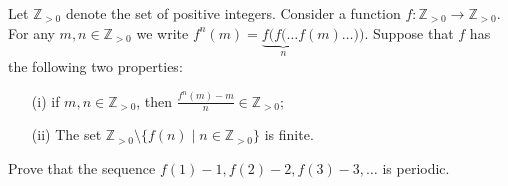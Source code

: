 Let 
$\mathbb{Z}_{>0}$
 denote the set of positive integers. Consider a function 
$f: \mathbb{Z}_{>0} \to \mathbb{Z}_{>0}$.
 For any 
$m, n \in \mathbb{Z}_{>0}$
 we write 
$f^n(m) = \underbrace{f(f(\ldots f}_{n}(m)\ldots))$.
 Suppose that 
$f$
 has the following two properties:

\begin{itemize}
	\item[(i)] if 
	$m, n \in \mathbb{Z}_{>0}$, 
	 then 
	$\frac{f^n(m) - m}{n} \in \mathbb{Z}_{>0}$;

	\item[(ii)] The set 
	$\mathbb{Z}_{>0} \setminus \{f(n) \mid n\in \mathbb{Z}_{>0}\}$
	 is finite.
\end{itemize}

Prove that the sequence 
$f(1) - 1, f(2) - 2, f(3) - 3, \ldots$
 is periodic.

